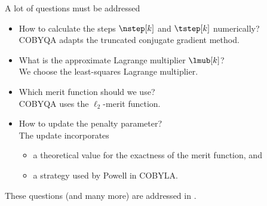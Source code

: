 \documentclass[optimization]{common/talk}
\begin{document}
\begin{frame}{A lot of questions must be addressed}
    \begin{itemize}
        \item How to calculate the steps $\nstep[k]$ and $\tstep[k]$ numerically?\\
        \textcolor{FernGreen}{COBYQA adapts the truncated conjugate gradient method.}
        \item What is the approximate Lagrange multiplier $\lmub[k]$?\\
        \textcolor{FernGreen}{We choose the least-squares Lagrange multiplier.}
        \item Which merit function should we use?\\
        \textcolor{FernGreen}{COBYQA uses the $\ell_2$-merit function.}
        \item How to update the penalty parameter?\\
        \textcolor{FernGreen}{The update incorporates}
        \begin{itemize}
            \item \textcolor{FernGreen}{a theoretical value for the exactness of the merit function, and}
            \item \textcolor{FernGreen}{a strategy used by Powell in COBYLA.}
        \end{itemize}
    \end{itemize}

    \medskip

    These questions (and many more) are addressed in \cite{Ragonneau_2022}.
\end{frame}
\end{document}
